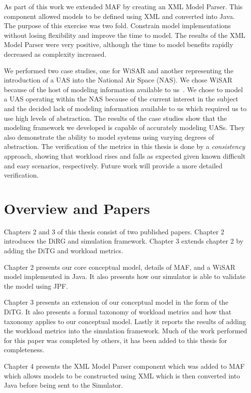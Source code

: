 As part of this work we extended MAF by creating an XML Model Parser.  This component allowed models to be defined using XML and converted into Java.  The purpose of this exercise was two fold.  Constrain model implementations without losing  flexibility and improve the time to model.  The results of the XML Model Parser were very positive, although the time to model benefits rapidly decreased as complexity increased.

We performed two case studies, one for WiSAR and another representing the introduction of a UAS into the National Air Space (NAS).  We chose WiSAR because of the host of modeling information available to us~\cite{adams2009cognitive}.  We chose to model a UAS operating within the NAS because of the current interest in the subject~\cite{nasroadmap} and the decided lack of modeling information available to us which required us to use high levels of abstraction.  The results of the case studies show that the modeling framework we developed is capable of accurately modeling UASs.  They also demonstrate the ability to model systems using varying degrees of abstraction.  The verification of the metrics in this thesis is done by a {\em consistency} approach, showing that workload rises and falls as expected given known difficult and easy scenarios, respectively.  Future work will provide a more detailed verification.


\section{Overview and Papers}

Chapters 2 and 3 of this thesis consist of two published papers.  Chapter 2 introduces the DiRG and simulation framework.  Chapter 3 extends chapter 2 by adding the DiTG and workload metrics.

Chapter 2 presents our core conceptual model, details of MAF, and a WiSAR model implemented in Java.  It also presents how our simulator is able to validate the model using JPF.

Chapter 3 presents an extension of our conceptual model in the form of the DiTG.  It also presents a formal taxonomy of workload metrics and how that taxonomy applies to our conceptual model.  Lastly it reports the results of adding the workload metrics into the simulation framework.  Much of the work performed for this paper was completed by others, it has been added to this thesis for completeness.

Chapter 4 presents the XML Model Parser component which was added to MAF which allows models to be constructed using XML which is then converted into Java before being sent to the Simulator.

